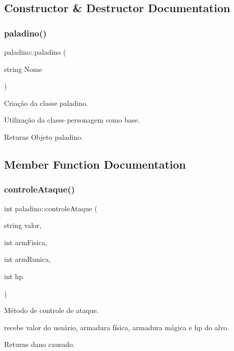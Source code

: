 \subsection{Constructor \& Destructor Documentation}
\mbox{\label{classpaladino_a312e5f9a43967aa31e34128051646277}} 
\subsubsection{\texorpdfstring{paladino()}{paladino()}}
{\footnotesize\ttfamily paladino\+::paladino (\begin{DoxyParamCaption}\item[{string}]{Nome }\end{DoxyParamCaption})}



Criação da classe paladino. 

Utilização da classe personagem como base. \begin{DoxyReturn}{Returns}
Objeto paladino. 
\end{DoxyReturn}


\subsection{Member Function Documentation}
\mbox{\label{classpaladino_a059fd05922c2adcbd87743b9c3552c11}} 
\subsubsection{\texorpdfstring{controle\+Ataque()}{controleAtaque()}}
{\footnotesize\ttfamily int paladino\+::controle\+Ataque (\begin{DoxyParamCaption}\item[{string}]{valor,  }\item[{int}]{arm\+Fisica,  }\item[{int}]{arm\+Runica,  }\item[{int}]{hp }\end{DoxyParamCaption})}



Método de controle de ataque. 

recebe valor do usuário, armadura física, armadura mágica e hp do alvo. \begin{DoxyReturn}{Returns}
dano causado. 
\end{DoxyReturn}
\mbox{\label{classpaladino_a62a3129268222902926377c6dd0dceb5}} 

